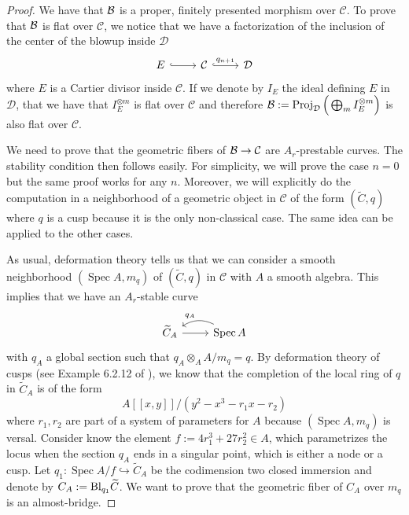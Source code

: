 \documentclass{alggeom}
\numberwithin{equation}{section}
\numberwithin{subsection}{section}
\theoremstyle{definition}
\theoremstyle{remark}
\newcommand\cC{\mathcal{C}} \newcommand\cD{\mathcal{D}}
\newcommand\into{\hookrightarrow}
\newcommand\spec{\operatorname{Spec}}
\newcommand{\proj}{\operatorname{Proj}}
\begin{document}
\begin{proof}
	We have that $\mathcal{B}$ is a proper, finitely presented morphism over $\cC$. To prove that $\mathcal{B}$ is flat over $\cC$, we notice that we have a factorization of the inclusion of the center of the blowup inside $\cD$
	$$
	\begin{tikzcd}
    E \arrow[r, hook] & \cC \arrow[r, "q_{n+1}", hook] & \cD
    \end{tikzcd}
    $$
	where $E$ is a Cartier divisor inside $\cC$. If we denote by $I_{E}$ the ideal defining $E$ in $\cD$, that we have that $I_{E}^{\otimes m}$ is flat over $\cC$ and therefore $\cB:=\proj_{\cD}\Big(\bigoplus_{m} I_{E}^{\otimes m} \Big)$ is also flat over $\cC$. 
	
	We need to prove that the geometric fibers of $\cB \rightarrow \cC$ are $A_r$-prestable curves. The stability condition then follows easily. For simplicity, we will prove the case $n=0$ but the same proof works for any $n$. Moreover, we will explicitly do the computation in a neighborhood of a geometric object in $\cC$ of the form $(\tilde{C},q)$ where $q$ is a cusp because it is the only non-classical case. The same idea can be applied to the other cases.
	
	As usual, deformation theory tells us that we can consider a smooth neighborhood $(\spec A,m_q)$ of $(\widetilde{C},q)$ in $\cC$ with $A$ a smooth algebra. This implies that we have an $A_r$-stable curve
	$$
	\begin{tikzcd}
		\widetilde{C}_A \arrow[r] & \spec A \arrow[l, "q_A"', bend right]
	\end{tikzcd}
	$$
	with $q_A$ a global section such that $q_A \otimes_A A/m_q = q$. By deformation theory of cusps (see Example 6.2.12 of \cite{TalVis}), we know that the completion of the local ring of $q$ in $\widetilde{C}_A$ is of the form
	$$ A[[x,y]]/(y^2-x^3-r_1x-r_2)$$
	where $r_1,r_2$ are part of a system of parameters for $A$ because $(\spec A, m_q)$ is versal. Consider know the element $f:=4r_1^3+27r_2^2 \in A$, which parametrizes the locus when the section $q_A$ ends in a singular point, which is either a node or a cusp. Let $q_1:\spec A/f \into \widetilde{C}_A$ be the codimension two closed immersion and denote by $C_A:={\rm Bl}_{q_1}\widetilde{C}$. We want to prove that the geometric fiber of $C_A$ over $m_q$ is an almost-bridge.
	

\end{proof}
\end{document}
